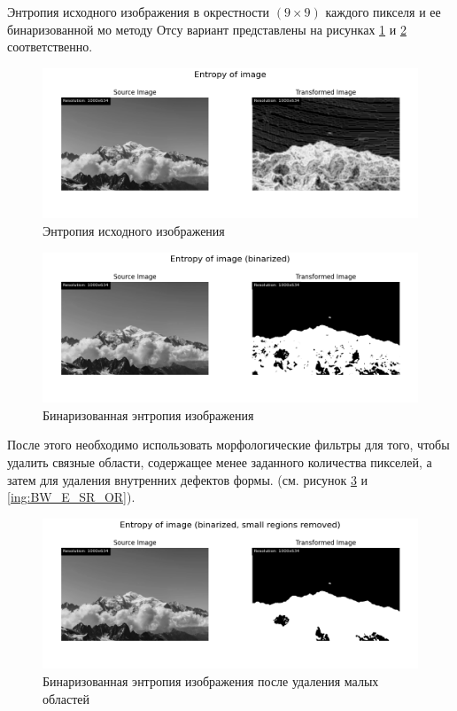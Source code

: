 Энтропия исходного изображения в окрестности $(9 \times 9)$ каждого пикселя и ее бинаризованной мо методу Отсу вариант представлены на рисунках \ref{img:texture_entropy} и \ref{img:texture_entropy_bin} соответственно.
\begin{figure}[ht!]
    \centering
    \includegraphics[width=\textwidth]{../results/Entropy of image.png}
    \caption{Энтропия исходного изображения}
    \label{img:texture_entropy}
\end{figure}

\begin{figure}[ht!]
    \centering
    \includegraphics[width=\textwidth]{../results/Entropy of image (binarized).png}
    \caption{Бинаризованная энтропия изображения}
    \label{img:texture_entropy_bin}
\end{figure}

\FloatBarrier
После этого необходимо использовать морфологические фильтры для того, чтобы удалить связные области, содержащее
менее заданного количества пикселей, а затем для удаления внутренних дефектов формы. (см. рисунок \ref{img:BW_E_SR} и \ref{ing:BW_E_SR_OR}).

\begin{figure}[ht!]
    \centering
    \includegraphics[width=\textwidth]{../results/Entropy of image (binarized, small regions removed).png}
    \caption{Бинаризованная энтропия изображения после удаления малых областей}
    \label{img:BW_E_SR}
\end{figure}

